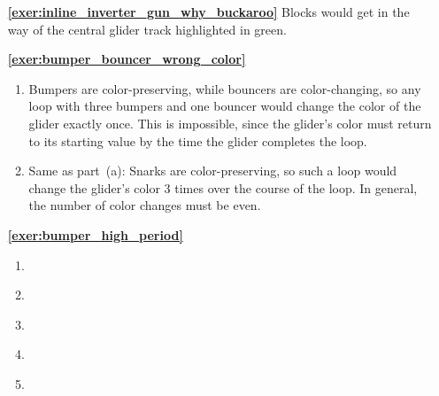 \begin{multicols}{2}
	\begin{itemize}[leftmargin=0em]
		\item[\bf\color{ocre}\sffamily\ref{exer:inline_inverter_gun_why_buckaroo}] Blocks would get in the way of the central glider track highlighted in green.\\
		
		
		\item[\bf\color{ocre}\sffamily\ref{exer:bumper_bouncer_wrong_color}]
		\begin{enumerate}[leftmargin=1.5em,label=\bf\color{ocre}(\alph*)]
			\item Bumpers are color-preserving, while bouncers are color-changing, so any loop with three bumpers and one bouncer would change the color of the glider exactly once. This is impossible, since the glider's color must return to its starting value by the time the glider completes the loop.
			
			\item Same as part~(a): Snarks are color-preserving, so such a loop would change the glider's color 3 times over the course of the loop. In general, the number of color changes must be even.\\
		\end{enumerate}
		
		
		\item[\bf\color{ocre}\sffamily\ref{exer:bumper_high_period}]
		\begin{enumerate}[leftmargin=1.5em,label=\bf\color{ocre}(\alph*)]
			\item {} \\
			
			\item {} \\
			
			\item {} \\
			
			\item {} \\
			
			\item {} \\[0.2em]
		\end{enumerate}
	


\end{itemize}
\end{multicols}
